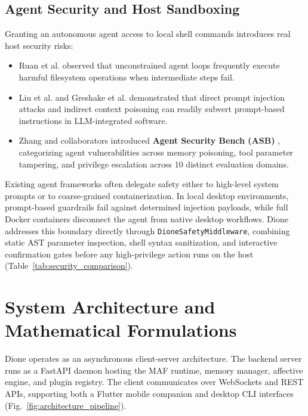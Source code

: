 \documentclass[conference,a4paper]{IEEEtran}
\begin{document}
\subsection{Agent Security and Host Sandboxing}
Granting an autonomous agent access to local shell commands introduces real host security risks:
\begin{itemize}
    \item Ruan et al. \cite{ruan2023identifying} observed that unconstrained agent loops frequently execute harmful filesystem operations when intermediate steps fail.
    \item Liu et al. \cite{liu2023prompt} and Greshake et al. \cite{greshake2023not} demonstrated that direct prompt injection attacks and indirect context poisoning can readily subvert prompt-based instructions in LLM-integrated software.
    \item Zhang and collaborators introduced \textbf{Agent Security Bench (ASB)} \cite{zhang2024agent}, categorizing agent vulnerabilities across memory poisoning, tool parameter tampering, and privilege escalation across 10 distinct evaluation domains.
\end{itemize}

Existing agent frameworks often delegate safety either to high-level system prompts or to coarse-grained containerization. In local desktop environments, prompt-based guardrails fail against determined injection payloads, while full Docker containers disconnect the agent from native desktop workflows. Dione addresses this boundary directly through \texttt{DioneSafetyMiddleware}, combining static AST parameter inspection, shell syntax sanitization, and interactive confirmation gates before any high-privilege action runs on the host (Table~\ref{tab:security_comparison}).

\section{System Architecture and Mathematical Formulations}

Dione operates as an asynchronous client-server architecture. The backend server runs as a FastAPI daemon hosting the MAF runtime, memory manager, affective engine, and plugin registry. The client communicates over WebSockets and REST APIs, supporting both a Flutter mobile companion and desktop CLI interfaces (Fig.~\ref{fig:architecture_pipeline}).
\end{document}
